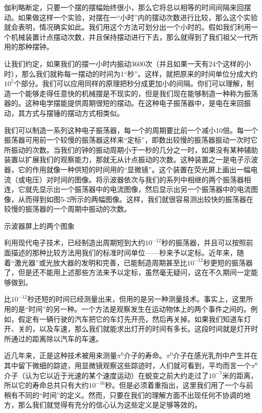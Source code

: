 \documentclass[12pt,oneside]{book}
\begin{document}
伽利略断定，只要一个摆的摆幅始终很小，那么它将总以相等的时间间隔来回摆动。如果做这样一个实验，对摆在一“小时”内的摆动次数进行比较，那么这个实验就会表明，情况确实如此。我们用这个方法可划分出一个小时的。假如我们利用一个机械装置计点摆动次数，并且保持摆动进行下去，那么就得到了我们祖父一代所用的那种摆钟。

让我们约定，如果我们的摆一小时内振动3600次（并且如果一天有24个这样的小时），那么我们就称每一摆动的时间为1“秒”。这样，就把原来的时间单位分成大约$ 10^5 $个部分。我们可以应用同样的原理把秒分成更加小的间隔。你们可以理解，制造一个能够走得任意快的机械摆是不现实的，但是我们现在能够制造一种称为振荡器的。这种电学摆能提供周期很短的摆动。在这种电子振荡器中，是电在来回振动，其方式与摆锤的摆动方式相类似。

我们可以制造一系列这种电子振荡器，每一个的周期要比前一个减小10倍。每一个振荡器可用前一个较慢的振荡器这样来“定标”，即数出较慢的振荡器振动一次时它所振动的次数。当我们的钟的振动周期小于一秒的几分之一时，如果没有某种辅助装置以扩展我们的观察能力，那就无从计点振动的次数。这种装置之一是电子示波器，它的作用就像一种供短的时间用的“显微镜”。这个装置在荧光屏上画出一幅电流（或电压）对时间的图像。将示波器依次与我们的系列中相继的两个振荡器相连，它就先显示出一个振荡器中的电流图像，然后显示出另一个振荡器中的电流图像，从而得到如图5-2所示的两幅图像。这样，我们就很容易测出较快的振荡器在较慢的振荡器的一个周期中振动的次数。
\begin{fig}[3]{示波器屏上的两个图象}
\caption{\footnotesize 示波器屏上的两个图象。在(a)中，示波器与一个振荡器相连接；在(b)中，它与另一个其周期只有前者十分之一的振荡器相连接。}
\label{fig:示波器屏上的两个图象}
\end{fig}


利用现代电子技术，已经制造出周期短到大约$ 10^{-12} $秒的振荡器，并且可以按照前面描述的那种比较方法用我们的标准时间单位——秒来予以定标。近年来，随着“激光器”或光放大器的发明和完善，已能制造周期甚至比$ 10^{-12} $秒更短的振荡器了，但是还不能用上述那些方法来予以定标，虽然毫无疑问，这在不久期间一定能够做到。

比$ 10^{-12} $秒还短的时间已经测量出来，但用的是另一种测量技术。事实上，这里所用的是“时间”的另一种。一个方法是观察发生在运动物体上的两个事件之间的。例如，假定有一辆行驶的汽车把它的车灯先开亮，然后再关掉。如果我们知道车灯开、关的，以及车速，那么我们就能求出灯开的时间有多长。这段时间就是灯开时所通过的距离除以汽车的车速。

近几年来，正是这种技术被用来测量$\pi^0$介子的寿命。$\pi^0$介子在感光乳剂中产生并在其中留下微细的踪迹，用显微镜观察这些踪迹时，人们就可看到，平均而言一个$\pi^0$介子（认为它以近于光速的某个速度运动）在蜕变之前大约走过了$ 10^{-7} $米的距离，所以它的寿命总共只有大约$ 10^{-16} $秒。但是必须着重指出，这里我们用了一个与前稍有不同的“时间”的定义。然而，只要在我们的理解方面不出现任何不协调的地方，那么我们就觉得有充分的信心认为这些定义是足够等效的。
\end{document}
